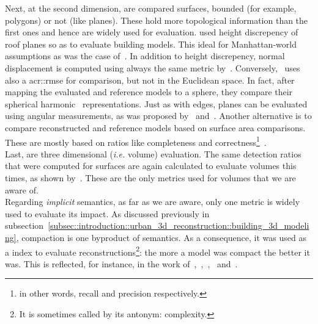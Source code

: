             Next, at the second dimension, are compared surfaces, bounded (for example, polygons) or not (like planes).
            These hold more topological information than the first ones and hence are widely used for evaluation.
            \textcite{rottensteiner2014results} used height discrepency of roof planes so as to evaluate building models.
            This ideal for Manhattan-world assumptions as was the case of~\textcite{zebedin2008fusion}.
            In addition to height discrepency, normal displacement is computed using always the same metric by~\textcite{henricsson19973}.
            Conversely,~\textcite{zeng2014multicriteria} uses also a \gls{acr::rmse} for comparison, but not in the Euclidean space.
            In fact, after mapping the evaluated and reference models to a sphere, they compare their spherical harmonic~\parencite{brechbuhler1995parametrization} representations.
            Just as with edges, planes can be evaluated using angular measurements, as was proposed by~\textcite{landes2012quality} and~\textcite{henricsson19973}.
            Another alternative is to compare reconstructed and reference models based on surface area comparisons.
            These are mostly based on ratios like completeness and correctness\footnote{in other words, recall and precision respectively.}~\parencite{rottensteiner2014results,landes2012quality,henricsson19973,schuster2003new}.\\
            Last, are three dimensional (\textit{i.e.} volume) evaluation.
            The same detection ratios that were computed for surfaces are again calculated to evaluate volumes this times, as shown by~\textcite{mohamed2013quality, zeng2014multicriteria,jaynes2003recognition,nguatem2017modeling}.
            These are the only metrics used for volumes that we are aware of.\\

            Regarding \textit{implicit} semantics, as far as we are aware, only one metric is widely used to evaluate its impact.
            As discussed previously in subsection~\ref{subsec::introduction::urban_3d_reconstruction::building_3d_modeling}, compaction is one byproduct of semantics.
            As a consequence, it was used as a index to evaluate reconstructions\footnote{It is sometimes called by its antonym: complexity.}: the more a model was compact the better it was.
            This is reflected, for instance, in the work of~\textcite{lafarge_ijcv12},~\textcite{zhang2017deep},~\textcite{duan_eccv16},~\textcite{zeng2018neural} and~\textcite{zhu2018large}.

